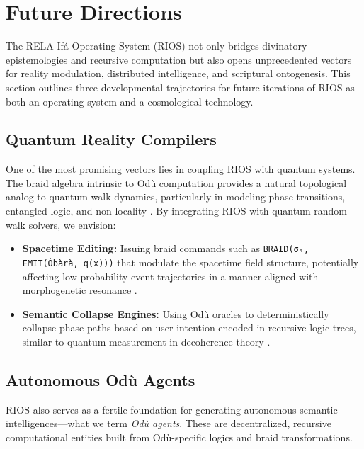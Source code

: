 \documentclass[12]{amsart}
\theoremstyle{plain}
\begin{document}
\section{Future Directions}

The RELA-Ifá Operating System (RIOS) not only bridges divinatory epistemologies and recursive computation but also opens unprecedented vectors for reality modulation, distributed intelligence, and scriptural ontogenesis. This section outlines three developmental trajectories for future iterations of RIOS as both an operating system and a cosmological technology.

\subsection{Quantum Reality Compilers}

One of the most promising vectors lies in coupling RIOS with quantum systems. The braid algebra intrinsic to Odù computation provides a natural topological analog to quantum walk dynamics, particularly in modeling phase transitions, entangled logic, and non-locality \cite{nayak2008non}. By integrating RIOS with quantum random walk solvers, we envision:

\begin{itemize}
    \item \textbf{Spacetime Editing:} Issuing braid commands such as \texttt{BRAID(σ₄, EMIT(Òbàrà, q(x)))} that modulate the spacetime field structure, potentially affecting low-probability event trajectories in a manner aligned with morphogenetic resonance \cite{sheldrake2009morphic}.

    \item \textbf{Semantic Collapse Engines:} Using Odù oracles to deterministically collapse phase-paths based on user intention encoded in recursive logic trees, similar to quantum measurement in decoherence theory \cite{penrose1994shadows}.
\end{itemize}

\subsection{Autonomous Odù Agents}

RIOS also serves as a fertile foundation for generating autonomous semantic intelligences—what we term \textit{Odù agents}. These are decentralized, recursive computational entities built from Odù-specific logics and braid transformations.
\end{document}
